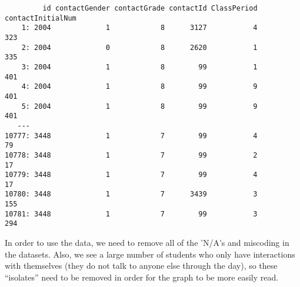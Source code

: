 \documentclass[
]{apa7}
\newenvironment{Shaded}{\begin{snugshade}}{\end{snugshade}}
\newcommand{\AttributeTok}[1]{\textcolor[rgb]{0.40,0.45,0.13}{#1}}
\newcommand{\CommentTok}[1]{\textcolor[rgb]{0.37,0.37,0.37}{#1}}
\newcommand{\FunctionTok}[1]{\textcolor[rgb]{0.28,0.35,0.67}{#1}}
\newcommand{\NormalTok}[1]{\textcolor[rgb]{0.00,0.23,0.31}{#1}}
\newcommand{\OtherTok}[1]{\textcolor[rgb]{0.00,0.23,0.31}{#1}}
\newcommand{\SpecialCharTok}[1]{\textcolor[rgb]{0.37,0.37,0.37}{#1}}
\newcommand{\StringTok}[1]{\textcolor[rgb]{0.13,0.47,0.30}{#1}}
\begin{document}
\begin{verbatim}
         id contactGender contactGrade contactId ClassPeriod contactInitialNum
    1: 2004             1            8      3127           4               323
    2: 2004             0            8      2620           1               335
    3: 2004             1            8        99           1               401
    4: 2004             1            8        99           9               401
    5: 2004             1            8        99           9               401
   ---                                                                        
10777: 3448             1            7        99           4                79
10778: 3448             1            7        99           2                17
10779: 3448             1            7        99           4                17
10780: 3448             1            7      3439           3               155
10781: 3448             1            7        99           3               294
\end{verbatim}

In order to use the data, we need to remove all of the 'N/A's and
miscoding in the datasets. Also, we see a large number of students who
only have interactions with themselves (they do not talk to anyone else
through the day), so these ``isolates'' need to be removed in order for
the graph to be more easily read.

\begin{Shaded}
\end{Shaded}
\end{document}
